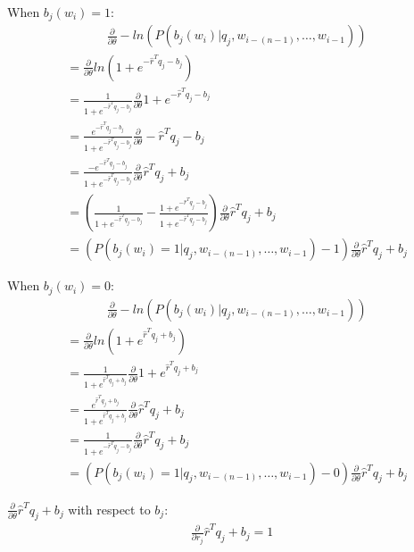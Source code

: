 When $b_j(w_i)  = 1$:
\begin{align*}
& \frac{\partial}{\partial \theta} -ln(P(b_j(w_i) | q_j, w_{i-(n-1)},\dots, w_{i-1})) 
\end{align*}
\begin{align*}
&=  \frac{\partial}{\partial \theta} ln (1 + e^{-\hat{r}^T q_{j} -b_{j}})
\\
&= \frac{1}{1 + e^{-\hat{r}^T q_{j} -b_{j}}} \frac{\partial}{\partial \theta}1 + e^{-\hat{r}^T q_{j} -b_{j}}
\\
&= \frac{e^{-\hat{r}^T q_{j} -b_{j}}}{1 + e^{-\hat{r}^T q_{j} -b_{j}}} \frac{\partial}{\partial \theta}-\hat{r}^T q_{j} -b_{j}
\\
&= \frac{-e^{-\hat{r}^T q_{j} -b_{j}}}{1 + e^{-\hat{r}^T q_{j} -b_{j}}} \frac{\partial}{\partial \theta}\hat{r}^T q_{j} +b_{j}
\\
&= \left( \frac{1}{1 + e^{-\hat{r}^T q_{j} -b_{j}}}  - \frac{1 + e^{-\hat{r}^T q_{j} -b_{j}}}{1 + e^{-\hat{r}^T q_{j} -b_{j}}} \right) \frac{\partial}{\partial \theta}\hat{r}^T q_{j} +b_{j}
\\
&= \left( P(b_j(w_i)=1 | q_j, w_{i-(n-1)},\dots, w_{i-1}) - 1 \right) \frac{\partial}{\partial \theta}\hat{r}^T q_{j} +b_{j}
\end{align*}

When $b_j(w_i)  = 0$:
\begin{align*}
& \frac{\partial}{\partial \theta} -ln(P(b_j(w_i) | q_j, w_{i-(n-1)},\dots, w_{i-1})) 
\end{align*}
\begin{align*}
&=  \frac{\partial}{\partial \theta} ln (1 + e^{\hat{r}^T q_{j} +b_{j}})
\\
&= \frac{1}{1 + e^{\hat{r}^T q_{j} +b_{j}}} \frac{\partial}{\partial \theta}1 + e^{\hat{r}^T q_{j} +b_{j}}
\\
&= \frac{e^{\hat{r}^T q_{j} +b_{j}}}{1 + e^{\hat{r}^T q_{j} +b_{j}}} \frac{\partial}{\partial \theta}\hat{r}^T q_{j} +b_{j}
\\
&= \frac{1}{1 + e^{-\hat{r}^T q_{j} -b_{j}}}  \frac{\partial}{\partial \theta}\hat{r}^T q_{j} +b_{j}
\\
&= \left( P(b_j(w_i)=1 | q_j, w_{i-(n-1)},\dots, w_{i-1}) - 0 \right) \frac{\partial}{\partial \theta}\hat{r}^T q_{j} +b_{j}
\end{align*}

$\frac{\partial}{\partial \theta}\hat{r}^T q_{j} +b_{j}$ with respect to $b_j$:
\begin{align*}
\frac{\partial}{\partial r_j}\hat{r}^T q_{j} +b_{j} = 1
\end{align*}

